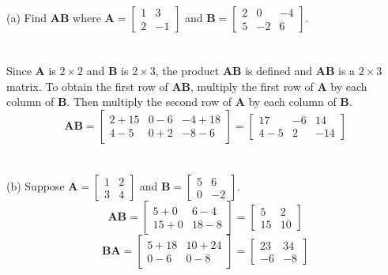 \documentclass[../setup.tex]{subfiles}
\begin{document}
\begin{example}
(a) Find $\bm{AB}$ where $\bm{A} = \begin{bmatrix} 1 & 3 \\ 2 & -1 \end{bmatrix}$ and $\bm{B} = \begin{bmatrix}2 & 0 &-4 \\ 5 & -2 & 6\end{bmatrix}$. \\
\phantom \\ \\
Since $\bm{A}$ is $2 \times 2$ and $\bm{B}$ is $2 \times 3$, the product $\bm{AB}$ is defined and $\bm{AB}$ is a $2 \times 3$ matrix. To obtain the first row of $\bm{AB}$, multiply the first row of $\bm{A}$ by each column of $\bm{B}$. Then multiply the second row of $\bm{A}$ by each column of $\bm{B}$. \\
\[\bm{AB} = \begin{bmatrix}2+15 & 0-6 & -4+18 \\ 4-5 & 0+2 & -8-6\end{bmatrix} = \begin{bmatrix}17 & -6 & 14 \\ 4-5 & 2 & -14\end{bmatrix}\]
\phantom \\ \\
(b) Suppose $\bm{A} = \begin{bmatrix}1 & 2 \\ 3 & 4\end{bmatrix}$ and $\bm{B} = \begin{bmatrix}5 & 6 \\ 0 & -2\end{bmatrix}$. \\
\[\bm{AB} = \begin{bmatrix}5+0 & 6-4 \\ 15+0 & 18-8\end{bmatrix} = \begin{bmatrix}5 & 2 \\ 15 & 10\end{bmatrix}\]
\[\bm{BA} = \begin{bmatrix}5+18 & 10+24 \\ 0-6 & 0-8\end{bmatrix} = \begin{bmatrix}23 & 34 \\ -6 & -8\end{bmatrix}\]
\end{example}
\end{document}
